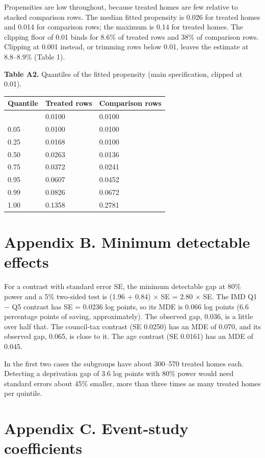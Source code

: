 \documentclass[11pt,a4paper]{article}
\begin{document}
Propensities are low throughout, because treated homes are few relative to stacked comparison rows. The median fitted propensity is 0.026 for treated homes and 0.014 for comparison rows; the maximum is 0.14 for treated homes. The clipping floor of 0.01 binds for 8.6\% of treated rows and 38\% of comparison rows. Clipping at 0.001 instead, or trimming rows below 0.01, leaves the estimate at 8.8--8.9\% (Table 1).

\textbf{Table A2.} Quantiles of the fitted propensity (main specification, clipped at 0.01).

{\small
\begin{longtable}[]{@{}lll@{}}
\toprule\noalign{}
Quantile & Treated rows & Comparison rows \\
\midrule\noalign{}
\endhead
\bottomrule\noalign{}
\endlastfoot
0.00 & 0.0100 & 0.0100 \\
0.05 & 0.0100 & 0.0100 \\
0.25 & 0.0168 & 0.0100 \\
0.50 & 0.0263 & 0.0136 \\
0.75 & 0.0372 & 0.0241 \\
0.95 & 0.0607 & 0.0452 \\
0.99 & 0.0826 & 0.0672 \\
1.00 & 0.1358 & 0.2781 \\
\end{longtable}
}

\section*{Appendix B. Minimum detectable effects}

For a contrast with standard error SE, the minimum detectable gap at 80\% power and a 5\% two-sided test is (1.96 + 0.84) × SE = 2.80 × SE. The IMD Q1 − Q5 contrast has SE = 0.0236 log points, so its MDE is 0.066 log points (6.6 percentage points of saving, approximately). The observed gap, 0.036, is a little over half that. The council-tax contrast (SE 0.0250) has an MDE of 0.070, and its observed gap, 0.065, is close to it. The age contrast (SE 0.0161) has an MDE of 0.045.

In the first two cases the subgroups have about 300--570 treated homes each. Detecting a deprivation gap of 3.6 log points with 80\% power would need standard errors about 45\% smaller, more than three times as many treated homes per quintile.

\section*{Appendix C. Event-study coefficients}
\end{document}
